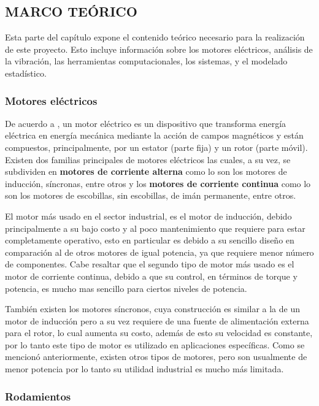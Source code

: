 \subsection{MARCO TEÓRICO}

Esta parte del capítulo expone el contenido teórico necesario para la
realización de este proyecto. Esto incluye información sobre los motores
eléctricos,  análisis de la vibración, las herramientas computacionales, los
sistemas, y el modelado estadístico.



\subsubsection{ Motores eléctricos}

De acuerdo a \Cite{Fraile}, un motor eléctrico es un dispositivo que
transforma energía eléctrica en
energía mecánica mediante la acción de campos magnéticos y están compuestos,
principalmente, por un estator (parte fija) y un rotor (parte móvil).
Existen dos familias principales de motores eléctricos las cuales, a su vez,
se subdividen en \textbf{motores de corriente alterna} como lo son los  motores
de inducción, síncronas, entre otros y los \textbf{motores de corriente continua}
como lo son los motores de escobillas,  sin escobillas, de imán permanente,
entre otros.

El motor más usado en el sector industrial, es el motor de inducción, debido
principalmente a su bajo costo y al poco mantenimiento que requiere para estar
completamente operativo, esto en particular es debido a su sencillo diseño
en comparación al de otros motores de igual potencia, ya que requiere  menor
número de componentes. Cabe resaltar que el segundo tipo de motor más usado es
el motor de corriente
continua, debido a que su control, en términos de torque y potencia, es mucho
mas sencillo para ciertos niveles de potencia.

También existen los motores síncronos, cuya construcción es similar a la de un
motor de inducción pero a su vez requiere de una fuente de alimentación externa
para el rotor, lo cual aumenta su costo, además de esto su velocidad es
constante, por lo tanto este tipo de motor es utilizado en aplicaciones
específicas. Como se mencionó anteriormente, existen otros tipos de motores,
pero son usualmente de menor potencia por
lo tanto su utilidad industrial es mucho más limitada.


\subsubsection*{Rodamientos}

